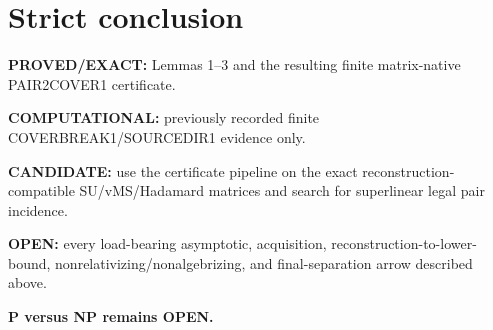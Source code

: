 \documentclass[11pt]{article}
\begin{document}
\section*{Strict conclusion}
\textbf{PROVED/EXACT:} Lemmas 1--3 and the resulting finite matrix-native PAIR2COVER1 certificate.

\textbf{COMPUTATIONAL:} previously recorded finite COVERBREAK1/SOURCEDIR1 evidence only.

\textbf{CANDIDATE:} use the certificate pipeline on the exact reconstruction-compatible SU/vMS/Hadamard matrices and search for superlinear legal pair incidence.

\textbf{OPEN:} every load-bearing asymptotic, acquisition, reconstruction-to-lower-bound, nonrelativizing/nonalgebrizing, and final-separation arrow described above.

\textbf{P versus NP remains OPEN.}

\end{document}
